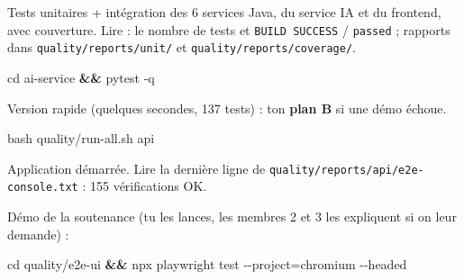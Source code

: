 \documentclass[
  11pt,
]{article}
\newenvironment{Shaded}{}{}
\newcommand{\AttributeTok}[1]{\textcolor[rgb]{0.49,0.56,0.16}{#1}}
\newcommand{\BuiltInTok}[1]{\textcolor[rgb]{0.00,0.50,0.00}{#1}}
\newcommand{\DecValTok}[1]{\textcolor[rgb]{0.25,0.63,0.44}{#1}}
\newcommand{\ExtensionTok}[1]{#1}
\newcommand{\FunctionTok}[1]{\textcolor[rgb]{0.02,0.16,0.49}{#1}}
\newcommand{\KeywordTok}[1]{\textcolor[rgb]{0.00,0.44,0.13}{\textbf{#1}}}
\newcommand{\NormalTok}[1]{#1}
\newcommand{\OperatorTok}[1]{\textcolor[rgb]{0.40,0.40,0.40}{#1}}
\newcommand{\StringTok}[1]{\textcolor[rgb]{0.25,0.44,0.63}{#1}}
\newcommand{\VariableTok}[1]{\textcolor[rgb]{0.10,0.09,0.49}{#1}}
\begin{document}
Tests unitaires + intégration des 6 services Java, du service IA et du
frontend, avec couverture. Lire : le nombre de tests et
\texttt{BUILD\ SUCCESS} / \texttt{passed} ; rapports dans
\texttt{quality/}\allowbreak{}\texttt{reports/}\allowbreak{}\texttt{unit/}\allowbreak{}
et
\texttt{quality/}\allowbreak{}\texttt{reports/}\allowbreak{}\texttt{coverage/}\allowbreak{}.

\begin{Shaded}
\begin{Highlighting}[]
\BuiltInTok{cd}\NormalTok{ ai{-}service }\KeywordTok{\&\&} \ExtensionTok{pytest} \AttributeTok{{-}q}
\end{Highlighting}
\end{Shaded}

Version rapide (quelques secondes, 137 tests) : ton \textbf{plan B} si
une démo échoue.

\begin{Shaded}
\begin{Highlighting}[]
\FunctionTok{bash}\NormalTok{ quality/run{-}all.sh api}
\end{Highlighting}
\end{Shaded}

Application démarrée. Lire la dernière ligne de
\texttt{quality/}\allowbreak{}\texttt{reports/}\allowbreak{}\texttt{api/}\allowbreak{}\texttt{e2e-}\allowbreak{}\texttt{console.}\allowbreak{}\texttt{txt}
: 155 vérifications OK.

Démo de la soutenance (tu les lances, les membres 2 et 3 les expliquent
si on leur demande) :

\begin{Shaded}
\begin{Highlighting}[]
\BuiltInTok{cd}\NormalTok{ quality/e2e{-}ui }\KeywordTok{\&\&} \ExtensionTok{npx}\NormalTok{ playwright test }\AttributeTok{{-}{-}project}\OperatorTok{=}\NormalTok{chromium }\AttributeTok{{-}{-}headed}
\end{Highlighting}
\end{Shaded}

\begin{Shaded}
\end{Shaded}
\end{document}

